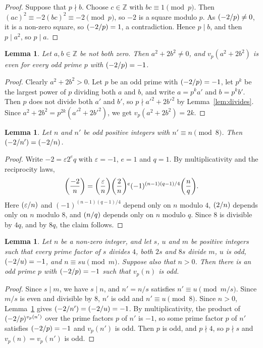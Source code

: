 \documentclass[11pt]{article}
\newtheorem{lemma}[theorem]{Lemma}
\newcommand{\Z}{\mathbb{Z}}
\newcommand{\leg}[2]{\mathchoice{\biggl(\dfrac{#1}{#2}\biggr)}{(#1/#2)}{(#1/#2)}{(#1/#2)}}
\begin{document}
\begin{proof}
Suppose that $p\nmid b$. Choose $c\in\Z$ with $bc\equiv1\pmod p$. Then $(ac)^2\equiv-2(bc)^2\equiv-2\pmod p$, so $-2$ is a square modulo $p$. As $\leg{-2}{p}\neq0$, it is a non-zero square, so $\leg{-2}{p}=1$, a contradiction. Hence $p\mid b$, and then $p\mid a^2$, so $p\mid a$.
\end{proof}

\begin{lemma}\label{lem:even}
Let $a,b\in\Z$ be not both zero. Then $a^2+2b^2\neq0$, and $v_p(a^2+2b^2)$ is even for every odd prime $p$ with $\leg{-2}{p}=-1$.
\end{lemma}

\begin{proof}
Clearly $a^2+2b^2>0$. Let $p$ be an odd prime with $\leg{-2}{p}=-1$, let $p^k$ be the largest power of $p$ dividing both $a$ and $b$, and write $a=p^ka'$ and $b=p^kb'$. Then $p$ does not divide both $a'$ and $b'$, so $p\nmid a'^2+2b'^2$ by Lemma~\ref{lem:divides}. Since $a^2+2b^2=p^{2k}(a'^2+2b'^2)$, we get $v_p(a^2+2b^2)=2k$.
\end{proof}

\begin{lemma}\label{lem:period}
Let $n$ and $n'$ be odd positive integers with $n'\equiv n\pmod{8}$. Then $\leg{-2}{n'}=\leg{-2}{n}$.
\end{lemma}

\begin{proof}
Write $-2=\varepsilon2^eq$ with $\varepsilon=-1$, $e=1$ and $q=1$. By multiplicativity and the reciprocity laws,
\[
\leg{-2}{n}=\leg{\varepsilon}{n}\leg{2}{n}^e(-1)^{(n-1)(q-1)/4}\leg{n}{q}.
\]
Here $\leg{\varepsilon}{n}$ and $(-1)^{(n-1)(q-1)/4}$ depend only on $n$ modulo $4$, $\leg{2}{n}$ depends only on $n$ modulo $8$, and $\leg{n}{q}$ depends only on $n$ modulo $q$. Since $8$ is divisible by $4q$, and by $8q$, the claim follows.
\end{proof}

\begin{lemma}\label{lem:odd}
Let $n$ be a non-zero integer, and let $s$, $u$ and $m$ be positive integers such that every prime factor of $s$ divides $4$, both $2s$ and $8s$ divide $m$, $u$ is odd, $\leg{-2}{u}=-1$, and $n\equiv su\pmod m$. Suppose also that $n>0$. Then there is an odd prime $p$ with $\leg{-2}{p}=-1$ such that $v_p(n)$ is odd.
\end{lemma}

\begin{proof}
Since $s\mid m$, we have $s\mid n$, and $n'=n/s$ satisfies $n'\equiv u\pmod{m/s}$. Since $m/s$ is even and divisible by $8$, $n'$ is odd and $n'\equiv u\pmod{8}$. Since $n>0$, Lemma~\ref{lem:period} gives $\leg{-2}{n'}=\leg{-2}{u}=-1$. By multiplicativity, the product of $\leg{-2}{p}^{v_p(n')}$ over the prime factors $p$ of $n'$ is $-1$, so some prime factor $p$ of $n'$ satisfies $\leg{-2}{p}=-1$ and $v_p(n')$ is odd. Then $p$ is odd, and $p\nmid4$, so $p\nmid s$ and $v_p(n)=v_p(n')$ is odd.
\end{proof}
\end{document}
